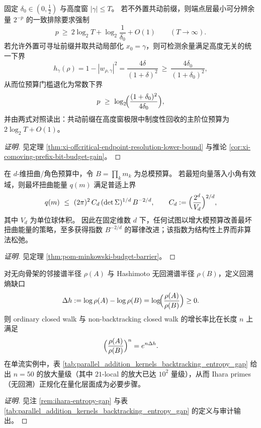 \begin{conclusion}\label{con:xi-terminal-comoving-address-bit-budget-recovery}
固定 \(\delta_0\in(0,\tfrac12)\) 与高度窗 \(|\gamma|\le T\)。
若不外置共动前缀，则端点层最小可分辨余量 \(2^{-p}\) 的一致排除要求强制
\[
p\ \ge\ 2\log_2 T+\log_2\!\frac{1}{\delta_0}+O(1)\qquad (T\to\infty).
\]
若允许外置可寻址前缀并取共动局部化 \(x_0=\gamma\)，则可检测余量满足高度无关的统一下界
\[
h_{\gamma}(\rho)=1-|w_{\rho,\gamma}|^2=\frac{4\delta}{(1+\delta)^2}\ \ge\ \frac{4\delta_0}{(1+\delta_0)^2},
\]
从而位预算门槛退化为常数下界
\[
p\ \ge\ \log_2\!\Bigl(\frac{(1+\delta_0)^2}{4\delta_0}\Bigr),
\]
并由两式对照读出：共动前缀在高度窗极限中制度性回收的主阶位预算为 \(2\log_2T+O(1)\)。
\end{conclusion}
\begin{proof}[证明]
见定理 \ref{thm:xi-offcritical-endpoint-resolution-lower-bound} 与推论 \ref{cor:xi-comoving-prefix-bit-budget-gain}。
\end{proof}

\begin{conclusion}\label{con:xi-terminal-minkowski-budget-barrier}
在 \(d\)-维扭曲/角色预算中，令 \(B=\prod_k m_k\) 为总模预算。
若最短向量落入小角有效域，则最坏扭曲能量 \(q(m)\) 满足普适上界
\[
q(m)\ \le\ (2\pi)^2\,C_d\,(\det\Sigma)^{1/d}\,B^{-2/d},
\qquad
C_d:=\Bigl(\frac{2^{d}}{V_d}\Bigr)^{2/d},
\]
其中 \(V_d\) 为单位球体积。
因此在固定维数 \(d\) 下，任何试图以增大模预算改善最坏扭曲能量的策略，至多获得指数 \(B^{-2/d}\) 的幂律改进；该指数为结构性上界而非算法松弛。
\end{conclusion}
\begin{proof}[证明]
见定理 \ref{thm:pom-minkowski-budget-barrier}。
\end{proof}

\begin{conclusion}\label{con:xi-terminal-backtracking-entropy-gap-exponential}
对无向骨架的邻接谱半径 \(\rho(A)\) 与 Hashimoto 无回溯谱半径 \(\rho(B)\)，定义回溯熵缺口
\[
\Delta h:=\log\rho(A)-\log\rho(B)=\log\!\Bigl(\frac{\rho(A)}{\rho(B)}\Bigr)\ge 0.
\]
则 ordinary closed walk 与 non-backtracking closed walk 的增长率比在长度 \(n\) 上满足
\[
\Bigl(\frac{\rho(A)}{\rho(B)}\Bigr)^n=e^{n\Delta h}.
\]
在单流实例中，表 \ref{tab:parallel_addition_kernels_backtracking_entropy_gap} 给出 \(n=50\) 的放大量级（其中 \(21\)-local 的放大已达 \(10^2\) 量级），从而 Ihara primes（无回溯）正规化在量化层面成为必要步骤。
\end{conclusion}
\begin{proof}[证明]
见注 \ref{rem:ihara-entropy-gap} 与表 \ref{tab:parallel_addition_kernels_backtracking_entropy_gap} 的定义与审计输出。
\end{proof}

